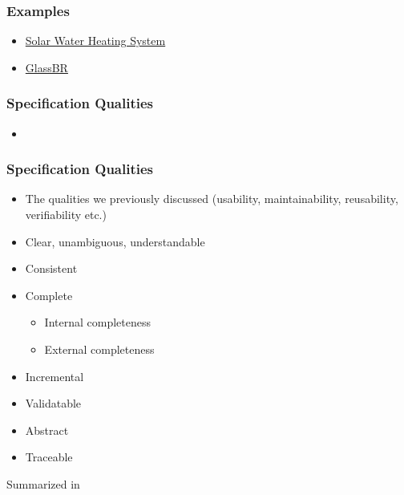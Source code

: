 \documentclass[t,12pt,numbers,fleqn]{beamer}
\begin{document}

\begin{frame}
\frametitle{Examples}
\begin{itemize}
\item \href{https://github.com/smiths/swhs} {Solar Water Heating System}
\item
  \href{https://github.com/smiths/caseStudies/tree/master/CaseStudies/glass/docs/SRS}
  {GlassBR}
\end{itemize}
\end{frame}


\begin{frame}
\frametitle{Specification Qualities}

\begin{itemize}

\item {}

\end{itemize}

\end{frame}


\begin{frame}
\frametitle{Specification Qualities}

\begin{itemize}
\item The qualities we previously discussed (usability, maintainability,
  reusability, verifiability etc.)
\item Clear, unambiguous,  understandable
\item Consistent
\item Complete
\begin{itemize}
\item Internal completeness
\item External completeness
\end{itemize}
\item Incremental
\item Validatable
\item Abstract
\item Traceable
\end{itemize}

Summarized in \cite[p.\ 406]{SmithAndKoothoor2016}

\end{frame}
\end{document}
